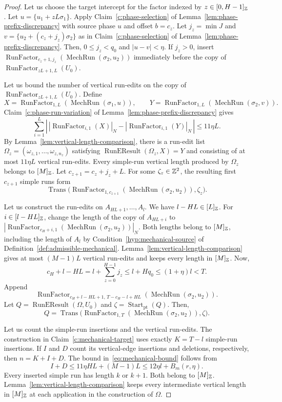 \begin{proof}
Let us choose the target intercept for the factor indexed by $z\in[0,H-1]_{\mathbb Z}$.
Let $u=\{u_1+zL\sigma_1\}$.
Apply Claim~\ref{c:phase-selection} of Lemma~\ref{lem:phase-prefix-discrepancy}
with source phase $u$ and offset $b=c_z$.
Let $j_z=\min J$ and $v=\{u_2+(c_z+j_z)\sigma_2\}$ as in Claim~\ref{c:phase-selection} of Lemma~\ref{lem:phase-prefix-discrepancy}.
Then, $0\le j_z<q_0$ and $|u-v|<\eta$.
If $j_z>0$, insert
$\operatorname{RunFactor}_{c_z+1,j_z}(\operatorname{MechRun}(\sigma_2,u_2))$
immediately before the copy of $\operatorname{RunFactor}_{zL+1,L}(U_0)$.

Let us bound the number of vertical run-edits on the copy of $\operatorname{RunFactor}_{zL+1,L}(U_0)$.
Define
\[
 X=\operatorname{RunFactor}_{1,L}(\operatorname{MechRun}(\sigma_1,u)),\qquad
 Y=\operatorname{RunFactor}_{1,L}(\operatorname{MechRun}(\sigma_2,v)).
\]
Claim~\ref{c:phase-run-variation} of Lemma~\ref{lem:phase-prefix-discrepancy} gives
\[
 \sum_{i=1}^L
 \left|\,|\operatorname{RunFactor}_{i,1}(X)|_N
       -|\operatorname{RunFactor}_{i,1}(Y)|_N\,\right|\le11\eta L.
\]
By Lemma~\ref{lem:vertical-length-comparison}, there is a run-edit list $\Omega_z=(\omega_{z,1},\ldots,\omega_{z,n_z})$ satisfying $\operatorname{RunEResult}(\Omega_z,X)=Y$ and consisting of at most $11\eta L$
vertical run-edits.
Every simple-run vertical length produced by $\Omega_z$ belongs to $[M]_{\mathbb Z}$.
Let $c_{z+1}=c_z+j_z+L$.
For some $\zeta_z\in\mathbb Z^2$, the resulting first $c_{z+1}$ simple runs form
\[
 \operatorname{Trans}\bigl(\operatorname{RunFactor}_{1,c_{z+1}}(\operatorname{MechRun}(\sigma_2,u_2)),\zeta_z\bigr).
\]

Let us construct the run-edits on $A_{HL+1},\ldots,A_l$.
We have $l-HL\in[L]_{\mathbb Z}$.
For $i\in[l-HL]_{\mathbb Z}$, change the length of the copy of $A_{HL+i}$ to
$|\operatorname{RunFactor}_{c_H+i,1}(\operatorname{MechRun}(\sigma_2,u_2))|_N$.
Both lengths belong to $[M]_{\mathbb Z}$, including the length of $A_l$ by Condition~\ref{hyp:mechanical-source} of Definition~\ref{def:admissible-mechanical}.
Lemma~\ref{lem:vertical-length-comparison} gives at most $(M-1)L$ vertical run-edits
and keeps every length in $[M]_{\mathbb Z}$.
Now,
\[
 c_H+l-HL=l+\sum_{z=0}^{H-1}j_z\le l+Hq_0\le(1+\eta)l<T.
\]
Append
\[
 \operatorname{RunFactor}_{c_H+l-HL+1,\,T-c_H-l+HL}
       (\operatorname{MechRun}(\sigma_2,u_2)).
\]
Let $Q=\operatorname{RunEResult}(\Omega,U_0)$ and $\zeta=\operatorname{Start}_{\mathrm{pt}}(Q)$.
Then,
\[
 Q=\operatorname{Trans}\bigl(\operatorname{RunFactor}_{1,T}(\operatorname{MechRun}(\sigma_2,u_2)),\zeta\bigr).
\]

 Let us count the simple-run insertions and the vertical run-edits.
The construction in Claim~\ref{c:mechanical-target} uses exactly $K=T-l$ simple-run insertions. If $I$ and $D$ count its vertical-edge insertions and deletions, respectively, then $n=K+I+D$. The bound in~\eqref{eq:mechanical-bound} follows from
\[
 I+D\le11\eta HL+(M-1)L\le12\eta l+B_m(r,\eta).
\]
 Every inserted simple run has length $k$ or $k+1$. Both belong to $[M]_{\mathbb Z}$.
Lemma~\ref{lem:vertical-length-comparison} keeps every intermediate vertical length in $[M]_{\mathbb Z}$ at each application in the construction of $\Omega$.
\end{proof}

